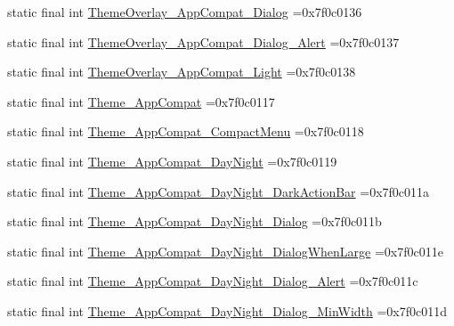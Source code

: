 \begin{DoxyCompactItemize}
\item 
static final int \mbox{\hyperlink{classbr_1_1unb_1_1cic_1_1mp_1_1marketmaster_1_1test_1_1R_1_1style_a92e7350adac8cfba29bcd939586bb15b}{Theme\+Overlay\+\_\+\+App\+Compat\+\_\+\+Dialog}} =0x7f0c0136
\item 
static final int \mbox{\hyperlink{classbr_1_1unb_1_1cic_1_1mp_1_1marketmaster_1_1test_1_1R_1_1style_a548e575760fd220475e8c581da3ce077}{Theme\+Overlay\+\_\+\+App\+Compat\+\_\+\+Dialog\+\_\+\+Alert}} =0x7f0c0137
\item 
static final int \mbox{\hyperlink{classbr_1_1unb_1_1cic_1_1mp_1_1marketmaster_1_1test_1_1R_1_1style_a7aa33f91fdcb88b41d231290e8fed650}{Theme\+Overlay\+\_\+\+App\+Compat\+\_\+\+Light}} =0x7f0c0138
\item 
static final int \mbox{\hyperlink{classbr_1_1unb_1_1cic_1_1mp_1_1marketmaster_1_1test_1_1R_1_1style_ab531c6214190da54fb0a3bc1b0640a24}{Theme\+\_\+\+App\+Compat}} =0x7f0c0117
\item 
static final int \mbox{\hyperlink{classbr_1_1unb_1_1cic_1_1mp_1_1marketmaster_1_1test_1_1R_1_1style_a013879a3da36cd622a4a634e2259f459}{Theme\+\_\+\+App\+Compat\+\_\+\+Compact\+Menu}} =0x7f0c0118
\item 
static final int \mbox{\hyperlink{classbr_1_1unb_1_1cic_1_1mp_1_1marketmaster_1_1test_1_1R_1_1style_a938e470c45e340f8cd41d62ce12b4e27}{Theme\+\_\+\+App\+Compat\+\_\+\+Day\+Night}} =0x7f0c0119
\item 
static final int \mbox{\hyperlink{classbr_1_1unb_1_1cic_1_1mp_1_1marketmaster_1_1test_1_1R_1_1style_ab7143d7ed48de0b9b045f502e1605938}{Theme\+\_\+\+App\+Compat\+\_\+\+Day\+Night\+\_\+\+Dark\+Action\+Bar}} =0x7f0c011a
\item 
static final int \mbox{\hyperlink{classbr_1_1unb_1_1cic_1_1mp_1_1marketmaster_1_1test_1_1R_1_1style_a76d5eeb77bce4af442845d49e3926ef4}{Theme\+\_\+\+App\+Compat\+\_\+\+Day\+Night\+\_\+\+Dialog}} =0x7f0c011b
\item 
static final int \mbox{\hyperlink{classbr_1_1unb_1_1cic_1_1mp_1_1marketmaster_1_1test_1_1R_1_1style_a0787a62560c0f5874d15c9ec973fd830}{Theme\+\_\+\+App\+Compat\+\_\+\+Day\+Night\+\_\+\+Dialog\+When\+Large}} =0x7f0c011e
\item 
static final int \mbox{\hyperlink{classbr_1_1unb_1_1cic_1_1mp_1_1marketmaster_1_1test_1_1R_1_1style_a16e6b648f39189fc3dd1b794405af4fc}{Theme\+\_\+\+App\+Compat\+\_\+\+Day\+Night\+\_\+\+Dialog\+\_\+\+Alert}} =0x7f0c011c
\item 
static final int \mbox{\hyperlink{classbr_1_1unb_1_1cic_1_1mp_1_1marketmaster_1_1test_1_1R_1_1style_a5e602ebdff103410ea06662b02129dd1}{Theme\+\_\+\+App\+Compat\+\_\+\+Day\+Night\+\_\+\+Dialog\+\_\+\+Min\+Width}} =0x7f0c011d

\end{DoxyCompactItemize}
